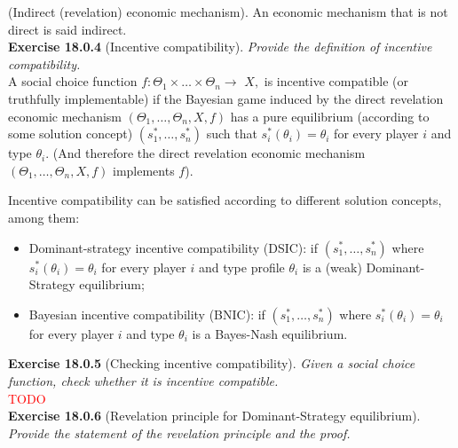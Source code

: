 (Indirect (revelation) economic mechanism). An economic mechanism that is not direct is said indirect.\\

\textbf{Exercise 18.0.4} (Incentive compatibility). \textit{Provide the definition of incentive compatibility.}\\

A social choice function $f: \Theta_{1} \times \ldots \times \Theta_{n} \rightarrow$ $X,$ is incentive compatible (or truthfully implementable) if the Bayesian game induced by the direct revelation economic mechanism $(\Theta_{1}, \ldots, \Theta_{n}, X, f)$ has a pure equilibrium (according to some solution concept) $(s^*_1, \ldots, s^*_n)$ such that $s^*_i (\theta_i) = \theta_i$ for every player $i$ and type $\theta_i$. (And therefore the direct revelation economic mechanism $(\Theta_{1}, \ldots, \Theta_{n}, X, f)$ implements $f$).

Incentive compatibility can be satisfied according to different solution concepts, among them:
\begin{itemize} 
\item Dominant-strategy incentive compatibility (DSIC): if $(s^*_1, \ldots, s^*_n)$ where $s^*_i (\theta_i) = \theta_i$ for every player $i$ and type profile $\theta_i$ is a (weak) Dominant-Strategy equilibrium;
\item Bayesian incentive compatibility (BNIC): if $(s^*_1, \ldots, s^*_n)$ where $s^*_i (\theta_i) = \theta_i$ for every player $i$ and type $\theta_i$ is a Bayes-Nash equilibrium.
\end{itemize}

\textbf{Exercise 18.0.5} (Checking incentive compatibility). \textit{Given a social choice function, check whether it is incentive compatible.}\\

\textcolor{red}{TODO}\\

\textbf{Exercise 18.0.6} (Revelation principle for Dominant-Strategy equilibrium). \textit{Provide the statement of the revelation principle and the proof.}\\

